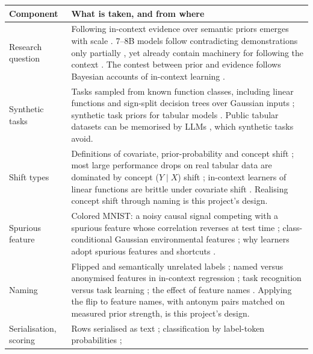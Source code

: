 \documentclass[11pt,a4paper]{article}
\newcommand{\1}{\mathbf{1}}
\theoremstyle{plain}
\theoremstyle{definition}
\theoremstyle{remark}
\begin{document}
{\small
\begin{longtable}{L{3.0cm}L{13.0cm}}
\toprule
\textbf{Component} & \textbf{What is taken, and from where} \\
\midrule
\endhead
\bottomrule
\endfoot
Research question &
Following in-context evidence over semantic priors emerges with scale
\citep{wei2023larger}. 7--8B models follow contradicting demonstrations
only partially \citep{kossen2024incontext,krishnakumar2025semantic}, yet
already contain machinery for following the context
\citep{halawi2024overthinking,minder2025controllable}. The contest between
prior and evidence follows Bayesian accounts of in-context learning
\citep{xie2022explanation}. \\
Synthetic tasks &
Tasks sampled from known function classes, including linear functions and
sign-split decision trees over Gaussian inputs \citep{garg2022what};
synthetic task priors for tabular models
\citep{muller2022transformers,hollmann2023tabpfn,hollmann2025accurate}.
Public tabular datasets
can be memorised by LLMs \citep{bordt2024elephants}, which synthetic tasks
avoid. \\
Shift types &
Definitions of covariate, prior-probability and concept shift
\citep{shimodaira2000improving,quinonero2009dataset,morenotorres2012unifying};
most large performance drops on real tabular data are dominated by concept
($Y \mid X$) shift \citep{liu2023need}; in-context learners of linear
functions are brittle under covariate shift \citep{zhang2024trained}. Realising concept shift through naming is this
project's design. \\
Spurious feature &
Colored MNIST: a noisy causal signal competing with a spurious feature whose
correlation reverses at test time \citep{arjovsky2019invariant};
class-conditional Gaussian environmental features
\citep{rosenfeld2021risks}; why learners adopt spurious features and
shortcuts \citep{nagarajan2021understanding,geirhos2020shortcut}. \\
Naming &
Flipped and semantically unrelated labels \citep{wei2023larger}; named
versus anonymised features in in-context regression
\citep{nafar2025learning}; task recognition versus task learning
\citep{pan2023what}; the effect of feature names
\citep{dinh2022lift,choi2022lmpriors}. Applying the flip to feature names,
with antonym pairs
matched on measured prior strength, is this project's design. \\
Serialisation, scoring &
Rows serialised as text \citep{hegselmann2023tabllm,dinh2022lift};
classification by label-token probabilities \citep{brown2020language};

\end{longtable}}
\end{document}
